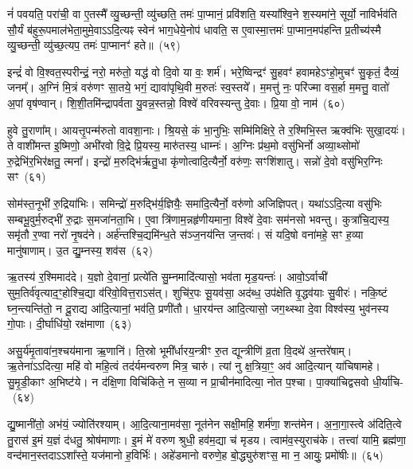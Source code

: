 नं॑ पवयति॒ परा॑ची॒ वा ए॒तस्मै᳚ व्यु॒च्छन्ती॒ व्यु॑च्छति॒ तमः॑ पा॒प्मानं॒ प्रवि॑शति॒ यस्या᳚श्वि॒ने श॒स्यमा॑ने॒ सूर्यो॒ नाविर्भव॑ति सौ॒र्यं ब॑हुरू॒पमाल॑भेता॒मुमे॒वाऽऽदि॒त्यꣴ स्वेन॑ भाग॒धेये॒नोप॑ धावति॒ स ए॒वास्मा॒त्तमः॑ पा॒प्मान॒मप॑हन्ति प्र॒तीच्य॑स्मै व्यु॒च्छन्ती॒ व्यु॑च्छ॒त्यप॒ तमः॑ पा॒प्मानꣳ॑ हते॥~(५९)

{\anuvakamend[{ल॒लामः॒ स ए॒व षट्च॑त्वारिꣳशच्च}]}%

इन्द्रं॑ वो वि॒श्वत॒स्परीन्द्रं॒ नरो॒ मरु॑तो॒ यद्ध॑ वो दि॒वो या वः॒ शर्म॑। भरे॒ष्विन्द्रꣳ॑ सु॒हवꣳ॑ हवामहे\-ऽꣳहो॒मुचꣳ॑ सु॒कृतं॒ दैव्यं॒ जनम्᳚। अ॒ग्निं मि॒त्रं वरु॑णꣳ सा॒तये॒ भगं॒ द्यावा॑पृथि॒वी म॒रुतः॑ स्व॒स्तये᳚। म॒मत्तु॑ नः॒ परि॑ज्मा वस॒र्\mbox{}हा म॒मत्तु॒ वातो॑ अ॒पां वृष॑ण्वान्। शि॒शी॒तमि॑न्द्रापर्वता यु॒वन्न॒स्तन्नो॒ विश्वे॑ वरिवस्यन्तु दे॒वाः। प्रि॒या वो॒ नाम॑~(६०)

हुवे तु॒राणा᳚म्। आयत्तृ॒पन्म॑रुतो वावशा॒नाः। श्रि॒यसे॒ कं भा॒नुभिः॒ सम्मि॑मिक्षिरे॒ ते र॒श्मिभि॒स्त ऋक्व॑भिः सुखा॒दयः॑। ते वाशी॑मन्त इ॒ष्मिणो॒ अभी॑रवो वि॒द्रे प्रि॒यस्य॒ मारु॑तस्य॒ धाम्नः॑। अ॒ग्निः प्र॑थ॒मो वसु॑भिर्नो अव्या॒थ्सोमो॑ रु॒द्रेभि॑र॒भिर॑क्षतु॒ त्मना᳚। इन्द्रो॑ म॒रुद्भि॑र्\mbox{}ऋतु॒धा कृ॑णोत्वादि॒त्यैर्नो॒ वरु॑णः॒ सꣳशि॑शातु। सन्नो॑ दे॒वो वसु॑भिर॒ग्निः सꣳ~(६१)

सोम॑स्त॒नूभी॑ रु॒द्रिया॑भिः। समिन्द्रो॑ म॒रुद्भि॑र्य॒ज्ञियैः॒ समा॑दि॒त्यैर्नो॒ वरु॑णो अजिज्ञिपत्। यथा॑\-ऽ\-ऽदि॒त्या वसु॑भिः सम्बभू॒वुर्म॒रुद्भी॑ रु॒द्राः स॒मजा॑नता॒भि। ए॒वा त्रि॑णाम॒न्नहृ॑णीयमाना॒ विश्वे॑ दे॒वाः सम॑नसो भवन्तु। कुत्रा॑चि॒द्यस्य॒ समृ॑तौ र॒ण्वा नरो॑ नृ॒षद॑ने। अर्\mbox{}ह॑न्तश्चि॒द्यमि॑न्ध॒ते स॑ञ्ज॒नय॑न्ति ज॒न्तवः॑। सं यदि॒षो वना॑महे॒ सꣳ ह॒व्या मानु॑षाणाम्। उ॒त द्यु॒म्नस्य॒ शव॑स~(६२)

ऋ॒तस्य॑ र॒श्मिमाद॑दे। य॒ज्ञो दे॒वानां॒ प्रत्ये॑ति सु॒म्नमादि॑त्यासो॒ भव॑ता मृड॒यन्तः॑। आवो॒\-ऽर्वाची॑ सुम॒तिर्व॑वृत्या\-द॒ꣳ॒होश्चि॒द्या व॑रिवो॒वित्त॒रा\-ऽस॑त्। शुचि॑र॒पः सू॒यव॑सा॒ अद॑ब्ध॒ उप॑क्षेति वृ॒द्धव॑याः सु॒वीरः॑। नकि॒ष्टं घ्न॒न्त्यन्ति॑तो॒ न दू॒राद्य आ॑दि॒त्यानां॒ भव॑ति॒ प्रणी॑तौ। धा॒रय॑न्त आदि॒त्यासो॒ जग॒थ्स्था दे॒वा विश्व॑स्य॒ भुव॑नस्य गो॒पाः। दी॒र्घाधि॑यो॒ रक्ष॑माणा~(६३)

असु॒र्य॑मृ॒तावा॑न॒श्चय॑माना ऋ॒णानि॑। ति॒स्रो भूमी᳚र्धारय॒न्त्रीꣳ रु॒त द्यून्त्रीणि॑ व्र॒ता वि॒दथे॑ अ॒न्तरे॑षाम्। ऋ॒तेना॑ऽऽदित्या॒ महि॑ वो महि॒त्वं तद॑र्यमन्वरुण मित्र॒ चारु॑। त्यां नु क्ष॒त्रिया॒ꣳ॒ अव॑ आदि॒त्यान् या॑चिषामहे। सु॒मृ॒डी॒काꣳ अ॒भिष्ट॑ये। न द॑क्षि॒णा विचि॑किते॒ न स॒व्या न प्रा॒चीन॑मादित्या॒ नोत प॒श्चा। पा॒क्या॑चिद्वसवो धी॒र्या॑चि-~(६४)

द्यु॒ष्मानी॑तो॒ अभ॑यं॒ ज्योति॑रश्याम्। आ॒दि॒त्याना॒मव॑सा॒ नूत॑नेन सक्षी॒महि॒ शर्म॑णा॒ शन्त॑मेन। अ॒ना॒गा॒स्त्वे अ॑दिति॒त्वे तु॒रास॑ इ॒मं य॒ज्ञं द॑धतु॒ श्रोष॑माणाः। इ॒मं मे॑ वरुण श्रुधी॒ हव॑म॒द्या च॑ मृडय। त्वाम॑व॒स्युराच॑के। तत्त्वा॑ यामि॒ ब्रह्म॑णा॒ वन्द॑मान॒स्तदाऽऽशा᳚स्ते॒ यज॑मानो ह॒विर्भिः॑। अहे॑डमानो वरुणे॒ह बो॒द्ध्युरु॑शꣳस॒ मा न॒ आयुः॒ प्रमो॑षीः॥~(६५)

